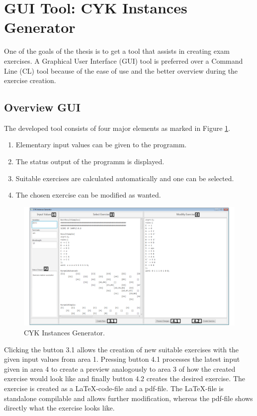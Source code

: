 
\section{GUI Tool: CYK Instances Generator }
One of the goals of the thesis is to get a tool that assists in creating exam exercises. A Graphical User Interface (GUI) tool is preferred over a Command Line (CL) tool because of the ease of use and the better overview during the exercise creation.
\subsection{Overview GUI}
The developed tool consists of four major elements as marked in Figure \ref{CYKInstancesGenerator}.
\begin{enumerate} [noitemsep]
	\item Elementary input values can be given to the programm.
	\item The status output of the programm is displayed.
	\item Suitable exercises are calculated automatically and one can be selected.
	\item The chosen exercise can be modified as wanted.
\end{enumerate}
\begin{figure}[h]
	\centering
	\includegraphics[width=\textwidth]{abb/CYKInstancesGenerator.pdf}
	\caption{CYK Instances Generator.}
	\label{CYKInstancesGenerator}
\end{figure}
Clicking the button 3.1 allows the creation of new suitable exercises with the given input values from area 1. Pressing button 4.1 processes the latest input given in area 4 to create a preview analogously to area 3 of how the created exercise would look like and finally button 4.2 creates the desired exercise. The exercise is created as a \LaTeX-code-file and a pdf-file. The \LaTeX-file is standalone compilable and allows further modification, whereas the pdf-file shows directly what the exercise looks like.
